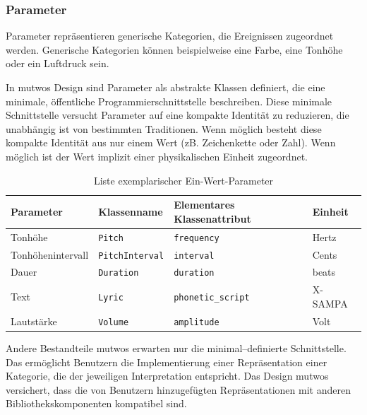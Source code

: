 \documentclass[12pt,a4paper,ngerman]{article}
\begin{document}
\subsubsection{Parameter}

Parameter repräsentieren generische Kategorien, die Ereignissen zugeordnet werden.
Generische Kategorien können beispielweise eine Farbe, eine Tonhöhe oder ein Luftdruck sein.

In mutwos Design sind Parameter als abstrakte Klassen definiert, die eine minimale, öffentliche Programmierschnittstelle beschreiben.
Diese minimale Schnittstelle versucht Parameter auf eine kompakte Identität zu reduzieren, die unabhängig ist von bestimmten Traditionen.
Wenn möglich besteht diese kompakte Identität aus nur einem Wert (zB. Zeichenkette oder Zahl).
Wenn möglich ist der Wert implizit einer physikalischen Einheit zugeordnet.

\begin{table}[h!]
    \begin{center}
        \begin{tabular}{l l l l} 
            \hline
            Parameter & Klassenname & Elementares Klassenattribut & Einheit \\ [0.5ex] 
            \hline\hline
            Tonhöhe & \texttt{Pitch} & \texttt{frequency} & Hertz \\ 
            Tonhöhenintervall & \texttt{PitchInterval} & \texttt{interval} & Cents \\ 
            Dauer & \texttt{Duration} & \texttt{duration} & beats \\ 
            Text & \texttt{Lyric} & \texttt{phonetic\_script} & X-SAMPA\footnotemark \\ 
            Lautstärke & \texttt{Volume} & \texttt{amplitude} & Volt \\ [1ex] 
            \hline
        \end{tabular}
    \end{center}

    \caption{Liste exemplarischer Ein-Wert-Parameter}
\end{table}


Andere Bestandteile mutwos erwarten nur die minimal--definierte Schnittstelle.
Das ermöglicht Benutzern die Implementierung einer Repräsentation einer Kategorie, die der jeweiligen Interpretation entspricht.
Das Design mutwos versichert, dass die von Benutzern hinzugefügten Repräsentationen mit anderen Bibliothekskomponenten kompatibel sind.
\end{document}

